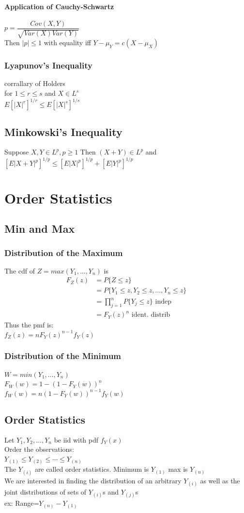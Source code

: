 \documentclass[openany]{book}
\begin{document}
\begin{flushleft}
\subsubsection{Application of Cauchy-Schwartz}
$p=\dfrac{Cov(X,Y)}{\sqrt{Var(X)Var(Y)}}$\\
Then $|p|\leq 1$ with equality iff $Y-\mu_Y=c(X-\mu_X)$
\subsection{Lyapunov's Inequality}
corrallary of Holders\\
for $1\leq r\leq s$ and $X\in L^s$\\
$E[|X|^r]^{1/r}\leq E[|X|^s]^{1/s}$
\section{Minkowski's Inequality}
Suppose $X,Y \in L^p, p\geq 1$ Then $(X+Y)\in L^p$ and\\
$[E|X+Y|^p]^{1/p}\leq [E|X|^p]^{1/p}+[E|Y|^p]^{1/p}$
\chapter{Order Statistics}
\section{Min and Max}
\subsection{Distribution of the Maximum}
The cdf of $Z=max(Y_1,\dots,Y_n)$ is\\
\begin{align*}
F_Z(z)&= P\{Z\leq z \}\\
&=P\{Y_1\leq z, Y_2 \leq z,\dots, Y_n \leq z \}\\
&=\prod_{j=1}^{n}P\{Y_j\leq z \} \text{ indep}\\
&=F_Y(z)^n \text{ ident. distrib}
\end{align*}
Thus the pmf is:\\
$f_Z(z)=nF_Y(z)^{n-1}f_Y(z)$
\subsection{Distribution of the Minimum}
$W=min(Y_1,\dots,Y_n)$\\
$F_W(w)=1-(1-F_Y(w))^n$\\
$f_W(w)=n(1-F_Y(w))^{n-1}f_Y(w)$
\section{Order Statistics}
Let $Y_1,Y_2,\dots, Y_n$ be iid with pdf $f_Y(x)$\\
Order the observations:\\
$Y_{(1)}\leq Y_{(2)}\leq \cdots \leq Y_{(n)}$\\
The $Y_{(i)}$ are called order statistics. Minimum is $Y_{(1)}$ max is $Y_{(n)}$\\
We are interested in finding the distribution of an arbitrary $Y_{(i)}$ as well as the joint distributions of sets of $Y_{(i)}$s and $Y_{(j)}$s\\
ex: Range=$Y_{(n)}-Y_{(1)}$

\end{flushleft}
\end{document}
